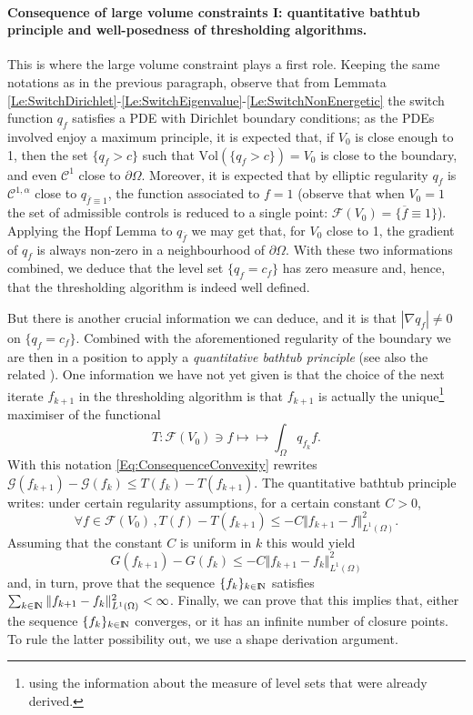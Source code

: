 \documentclass{article}
\newcommand{\N}{\textnormal{I\kern-0.21emN}}
\renewcommand{\leq}{\leqslant}
\def\O{{\Omega}}
\def\n{{\nabla}}
\numberwithin{equation}{section}
\begin{document}
\paragraph{Consequence of large volume constraints I: quantitative bathtub principle and well-posedness of thresholding algorithms.}
This is where the large volume constraint plays a first role. Keeping the same notations as in the previous paragraph, observe that from Lemmata \ref{Le:SwitchDirichlet}-\ref{Le:SwitchEigenvalue}-\ref{Le:SwitchNonEnergetic} the switch function $q_f$ satisfies a PDE with Dirichlet boundary conditions; as the PDEs involved enjoy a maximum principle, it is expected that, if $V_0$ is close enough to 1, then the set $\{q_f>c\}$ such that $\mathrm{Vol}(\{q_f>c\})=V_0$ is close to the boundary, and even $\mathscr C^1$ close to $\partial \O$. Moreover, it is expected that by elliptic regularity $q_f$ is $\mathscr C^{1,\alpha}$ close to $q_{\overline f\equiv 1}$, the function associated to $f=1$ (observe that when $V_0=1$ the set of admissible controls is reduced to a single point: $\mathcal F(V_0)=\{\overline f\equiv 1\}$).  Applying the Hopf Lemma to $q_{\overline f}$ we may get that, for $V_0$ close to 1, the gradient of $q_f$ is always non-zero in a neighbourhood of $\partial \O$. With these two informations combined, we deduce that the level set $\{q_f=c_f\}$ has zero measure and, hence,  that the thresholding algorithm is indeed well defined.

But there is another crucial information we can deduce, and it is that $|\n q_f|\neq 0$ on $\{q_f=c_f\}$. Combined with the aforementioned regularity of the boundary we are then in a position to apply a \emph{quantitative bathtub principle} \cite[Proposition 26]{MRB2020} (see also the related \cite{Cianchi2008}). One information we have not yet given is that the choice of the next iterate $f_{k+1}$ in the thresholding algorithm is that $f_{k+1}$ is actually the unique\footnote{using the information about the measure of level sets that were already derived.} maximiser of the functional 
\[T:\mathcal F(V_0)\ni f\mapsto \mapsto \int_\O q_{f_k}f.\] With this notation \eqref{Eq:ConsequenceConvexity} rewrites $\mathcal G(f_{k+1})-\mathcal G(f_k)\leq T(f_k)-T(f_{k+1})$. The quantitative bathtub principle writes: under certain regularity assumptions, for a certain constant $C>0$,
\[\forall f\in \mathcal F(V_0)\,, T(f)-T(f_{k+1})\leq -C\Vert f_{k+1}-f\Vert_{L^1(\O)}^2.
\]Assuming that the constant $C$ is uniform in $k$ this would yield 
\[ G(f_{k+1})-G(f_k)\leq -C\Vert f_{k+1}-f_k\Vert_{L^1(\O)}^2\] and, in turn, prove that the sequence $\{f_k\}_{k\in \N}$ satisfies $\sum_{k\in \N}\Vert f_{k+1}-f_k\Vert_{L^1(\O)}^2<\infty$. Finally, we can prove that this implies that, either the sequence $\{f_k\}_{k\in \N}$ converges, or it has an infinite number of closure points. To rule the latter possibility out, we use a shape derivation argument.
\end{document}
